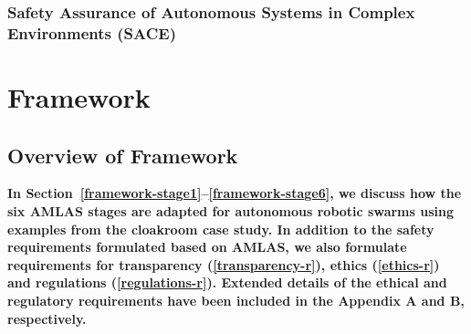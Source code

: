 \documentclass[lettersize,journal]{IEEEtran}
\begin{document}
\subsubsection{Safety Assurance of Autonomous Systems in Complex Environments (SACE)}
\cite{SACE2022}

\section{Framework}\label{framework}

\subsection{Overview of Framework} \label{framework-overview}
\textbf{In Section~\ref{framework-stage1}--\ref{framework-stage6}, we discuss how the six AMLAS stages are adapted for autonomous robotic swarms using examples from the cloakroom case study. In addition to the safety requirements formulated based on AMLAS, we also formulate requirements for transparency (\ref{transparency-r}), ethics (\ref{ethics-r}) and regulations (\ref{regulations-r}). Extended details of the ethical and regulatory requirements have been included in the Appendix A and B, respectively.}\\

%
%
\vspace{2mm}

\end{document}

